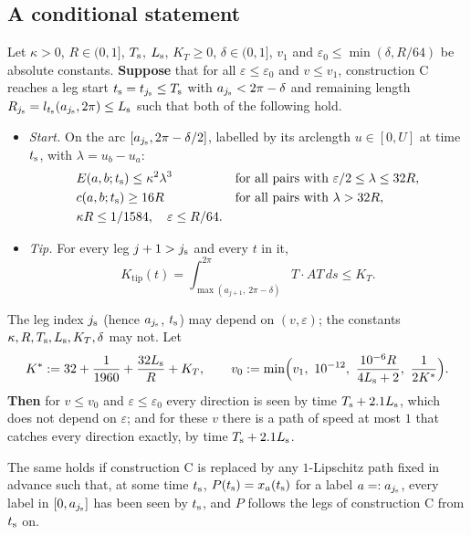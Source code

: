 \subsection{A conditional statement}

\begin{corollary}\label{cor:M}
Let $\kappa>0$, $R\in(0,1]$, $T_{\mathrm s}$, $L_{\mathrm s}$, $K_T\ge0$, $\delta\in(0,1]$, $v_1$ and $\varepsilon_0\le\min(\delta,R/64)$ be absolute
constants. \textbf{Suppose} that for all $\varepsilon\le\varepsilon_0$ and $v\le v_1$, construction C reaches a leg start
$t_{\mathrm s}=t_{j_{\mathrm s}}\le T_{\mathrm s}$ with $a_{j_{\mathrm s}}<2\pi-\delta$ and remaining length $R_{j_{\mathrm s}}=l_{t_{\mathrm s}}(a_{j_{\mathrm s}},2\pi)\le L_{\mathrm s}$ such that both of the
following hold.
\begin{itemize}
\item[\textup{(ST)}] \emph{Start.} On the arc $[a_{j_{\mathrm s}},2\pi-\delta/2]$, labelled by its arclength $u\in[0,U]$ at time $t_{\mathrm s}$, with
$\lambda=u_b-u_a$:
\[
\begin{aligned}
&E(a,b;t_{\mathrm s})\le\kappa^2\lambda^3&&\text{for all pairs with }\varepsilon/2\le\lambda\le32R,\\
&c(a,b;t_{\mathrm s})\ge16R&&\text{for all pairs with }\lambda>32R,\\
&\kappa R\le1/1584,\quad\varepsilon\le R/64 .
\end{aligned}
\]
\item[\textup{(T)}] \emph{Tip.} For every leg $j+1>j_{\mathrm s}$ and every $t$ in it,
\[
K_{\mathrm{tip}}(t)=\int_{\max(a_{j+1},\,2\pi-\delta)}^{2\pi}T\cdot AT\,ds\le K_T .
\]
\end{itemize}
The leg index $j_{\mathrm s}$ (hence $a_{j_{\mathrm s}}$, $t_{\mathrm s}$) may depend on $(v,\varepsilon)$; the constants
$\kappa,R,T_{\mathrm s},L_{\mathrm s},K_T,\delta$ may not. Let
\[
K^*:=32+\frac1{1960}+\frac{32\BLs}R+K_T,\qquad v_0:=\min\Bigl(v_1,\ 10^{-12},\ \frac{10^{-6}R}{4\BLs+2},\ \frac1{2K^*}\Bigr).
\]
\textbf{Then} for $v\le v_0$ and $\varepsilon\le\varepsilon_0$ every direction is seen by time $T_{\mathrm s}+2.1L_{\mathrm s}$, which does not depend
on $\varepsilon$; and for these $v$ there is a path of speed at most $1$ that catches every direction exactly, by time
$T_{\mathrm s}+2.1L_{\mathrm s}$.

The same holds if construction C is replaced by any $1$-Lipschitz path fixed in advance such that, at some time $t_{\mathrm s}$,
$P(t_{\mathrm s})=x_a(t_{\mathrm s})$ for a label $a=:a_{j_{\mathrm s}}$, every label in $[0,a_{j_{\mathrm s}}]$ has been seen by $t_{\mathrm s}$, and $P$ follows the legs of
construction C from $t_{\mathrm s}$ on.
\end{corollary}
